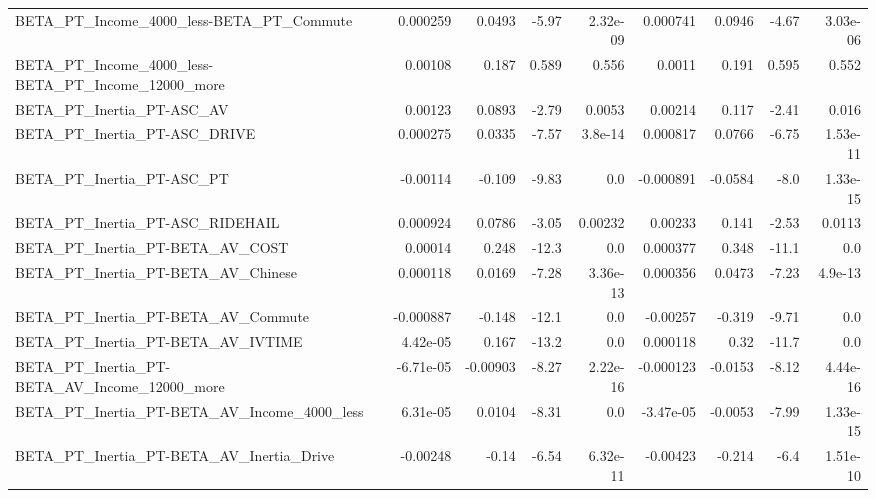 \begin{tabular}{lrrrrrrrr}
BETA\_PT\_Income\_4000\_less-BETA\_PT\_Commute           &    0.000259 &       0.0493 &    -5.97 & 2.32e-09 &   0.000741 &      0.0946 &        -4.67 &      3.03e-06 \\
BETA\_PT\_Income\_4000\_less-BETA\_PT\_Income\_12000\_more &     0.00108 &        0.187 &    0.589 &    0.556 &     0.0011 &       0.191 &        0.595 &         0.552 \\
BETA\_PT\_Inertia\_PT-ASC\_AV                          &     0.00123 &       0.0893 &    -2.79 &   0.0053 &    0.00214 &       0.117 &        -2.41 &         0.016 \\
BETA\_PT\_Inertia\_PT-ASC\_DRIVE                       &    0.000275 &       0.0335 &    -7.57 &  3.8e-14 &   0.000817 &      0.0766 &        -6.75 &      1.53e-11 \\
BETA\_PT\_Inertia\_PT-ASC\_PT                          &    -0.00114 &       -0.109 &    -9.83 &      0.0 &  -0.000891 &     -0.0584 &         -8.0 &      1.33e-15 \\
BETA\_PT\_Inertia\_PT-ASC\_RIDEHAIL                    &    0.000924 &       0.0786 &    -3.05 &  0.00232 &    0.00233 &       0.141 &        -2.53 &        0.0113 \\
BETA\_PT\_Inertia\_PT-BETA\_AV\_COST                    &     0.00014 &        0.248 &    -12.3 &      0.0 &   0.000377 &       0.348 &        -11.1 &           0.0 \\
BETA\_PT\_Inertia\_PT-BETA\_AV\_Chinese                 &    0.000118 &       0.0169 &    -7.28 & 3.36e-13 &   0.000356 &      0.0473 &        -7.23 &       4.9e-13 \\
BETA\_PT\_Inertia\_PT-BETA\_AV\_Commute                 &   -0.000887 &       -0.148 &    -12.1 &      0.0 &   -0.00257 &      -0.319 &        -9.71 &           0.0 \\
BETA\_PT\_Inertia\_PT-BETA\_AV\_IVTIME                  &    4.42e-05 &        0.167 &    -13.2 &      0.0 &   0.000118 &        0.32 &        -11.7 &           0.0 \\
BETA\_PT\_Inertia\_PT-BETA\_AV\_Income\_12000\_more       &   -6.71e-05 &     -0.00903 &    -8.27 & 2.22e-16 &  -0.000123 &     -0.0153 &        -8.12 &      4.44e-16 \\
BETA\_PT\_Inertia\_PT-BETA\_AV\_Income\_4000\_less        &    6.31e-05 &       0.0104 &    -8.31 &      0.0 &  -3.47e-05 &     -0.0053 &        -7.99 &      1.33e-15 \\
BETA\_PT\_Inertia\_PT-BETA\_AV\_Inertia\_Drive           &    -0.00248 &        -0.14 &    -6.54 & 6.32e-11 &   -0.00423 &      -0.214 &         -6.4 &      1.51e-10 \\

\end{tabular}

